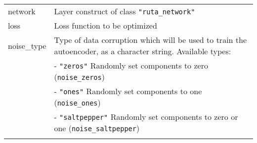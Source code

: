 \begin{longtable}[c]{@{}ll@{}}
\toprule
\begin{minipage}[t]{0.07\columnwidth}\raggedright\strut
network
\strut\end{minipage} &
\begin{minipage}[t]{0.87\columnwidth}\raggedright\strut
Layer construct of class \texttt{"ruta\_network"}
\strut\end{minipage}\tabularnewline
\begin{minipage}[t]{0.07\columnwidth}\raggedright\strut
loss
\strut\end{minipage} &
\begin{minipage}[t]{0.87\columnwidth}\raggedright\strut
Loss function to be optimized
\strut\end{minipage}\tabularnewline
\begin{minipage}[t]{0.07\columnwidth}\raggedright\strut
noise\_type
\strut\end{minipage} &
\begin{minipage}[t]{0.87\columnwidth}\raggedright\strut
Type of data corruption which will be used to train the autoencoder, as
a character string. Available types:
\strut\end{minipage}\tabularnewline
\begin{minipage}[t]{0.07\columnwidth}\raggedright\strut
\strut\end{minipage} &
\begin{minipage}[t]{0.87\columnwidth}\raggedright\strut
- \texttt{"zeros"} Randomly set components to zero
(\texttt{noise\_zeros})
\strut\end{minipage}\tabularnewline
\begin{minipage}[t]{0.07\columnwidth}\raggedright\strut
\strut\end{minipage} &
\begin{minipage}[t]{0.87\columnwidth}\raggedright\strut
- \texttt{"ones"} Randomly set components to one (\texttt{noise\_ones})
\strut\end{minipage}\tabularnewline
\begin{minipage}[t]{0.07\columnwidth}\raggedright\strut
\strut\end{minipage} &
\begin{minipage}[t]{0.87\columnwidth}\raggedright\strut
- \texttt{"saltpepper"} Randomly set components to zero or one
(\texttt{noise\_saltpepper})
\strut\end{minipage}\tabularnewline
\begin{minipage}[t]{0.07\columnwidth}\raggedright\strut

\end{minipage}
\end{longtable}
